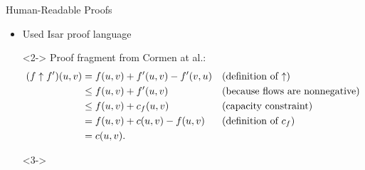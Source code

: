 \documentclass[fleqn]{beamer}
\begin{document}
\begin{frame}{Human-Readable Proofs}
  \begin{itemize}
   \item<1-> Used Isar proof language
  
    \begin{uncoverenv}<2->
    {\footnotesize Proof fragment from Cormen at al.:
    \begin{align*}
    (f \uparrow f') (u, v) &= f(u, v) + f'(u, v) - f'(v, u)  && \text{(definition of ${\mathbin\uparrow}$)} \\
    & \leq f(u, v) + f'(u, v) && \text{(because flows are nonnegative)} \\
    & \leq f(u, v) + c_f(u, v) &&  \text{(capacity constraint)} \\
    & = f(u, v) + c(u, v) - f(u, v) && \text{(definition of $c_f$)} \\
    & = c (u, v).
    \end{align*}
    }
    \end{uncoverenv}

    \begin{uncoverenv}<3->
    \end{uncoverenv}

  \end{itemize}
\end{frame}
\end{document}
